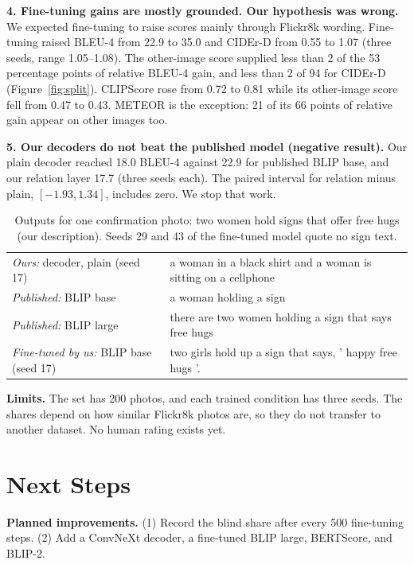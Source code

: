 \documentclass[11pt]{article}
\begin{document}
\textbf{4. Fine-tuning gains are mostly grounded. Our hypothesis was wrong.}
We expected fine-tuning to raise scores mainly through Flickr8k wording.
Fine-tuning raised BLEU-4 from 22.9 to 35.0 and CIDEr-D from 0.55 to 1.07
(three seeds, range 1.05--1.08). The other-image score supplied less than 2 of the 53
percentage points of relative BLEU-4 gain, and less than 2 of 94 for CIDEr-D
(Figure~\ref{fig:split}). CLIPScore
rose from 0.72 to 0.81 while its other-image score fell from 0.47 to 0.43.
METEOR is the exception: 21 of its 66 points of relative gain appear on other
images too.

\textbf{5. Our decoders do not beat the published model (negative result).}
Our plain decoder reached 18.0 BLEU-4 against 22.9 for published BLIP base, and our
relation layer 17.7 (three seeds each). The paired
interval for relation minus plain, $[-1.93, 1.34]$, includes zero. We stop that work.

\begin{table}[h]
\centering\footnotesize
\begin{tabular}{@{}ll@{}}
\toprule
\emph{Ours:} decoder, plain (seed 17) & a woman in a black shirt and a woman is sitting on a cellphone \\
\emph{Published:} BLIP base & a woman holding a sign \\
\emph{Published:} BLIP large & there are two women holding a sign that says free hugs \\
\emph{Fine-tuned by us:} BLIP base (seed 17) & two girls hold up a sign that says, ' happy free hugs '. \\
\bottomrule
\end{tabular}
\caption{Outputs for one confirmation photo: two women hold signs that offer
free hugs (our description). Seeds 29 and 43 of the fine-tuned model quote no sign text.}
\label{tab:examples}
\end{table}

\textbf{Limits.} The set has 200 photos, and each trained condition has three seeds. The
shares depend on how similar Flickr8k photos are, so they do not transfer to
another dataset. No human rating exists yet.

\section{Next Steps}

\textbf{Planned improvements.}
(1) Record the blind share after every 500 fine-tuning steps.
(2) Add a ConvNeXt decoder, a fine-tuned BLIP large, BERTScore, and BLIP-2.
\end{document}
